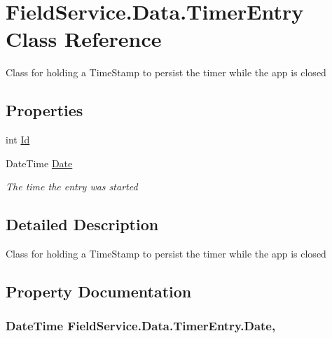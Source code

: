 \hypertarget{class_field_service_1_1_data_1_1_timer_entry}{\section{Field\+Service.\+Data.\+Timer\+Entry Class Reference}
\label{class_field_service_1_1_data_1_1_timer_entry}
}


Class for holding a Time\+Stamp to persist the timer while the app is closed  


\subsection*{Properties}
\begin{DoxyCompactItemize}
\item 
int \hyperlink{class_field_service_1_1_data_1_1_timer_entry_ab9e04cf51877fe4262e32bf902341049}{Id}
\item 
Date\+Time \hyperlink{class_field_service_1_1_data_1_1_timer_entry_acb69cc10e714c981b493c81715c900c3}{Date}
\begin{DoxyCompactList}\small\item\em The time the entry was started \end{DoxyCompactList}\end{DoxyCompactItemize}


\subsection{Detailed Description}
Class for holding a Time\+Stamp to persist the timer while the app is closed 



\subsection{Property Documentation}
\hypertarget{class_field_service_1_1_data_1_1_timer_entry_acb69cc10e714c981b493c81715c900c3}{
\subsubsection[{Date}]{\setlength{\rightskip}{0pt plus 5cm}Date\+Time Field\+Service.\+Data.\+Timer\+Entry.\+Date\hspace{0.3cm}{\ttfamily [get]}, {\ttfamily [set]}}}\label{class_field_service_1_1_data_1_1_timer_entry_acb69cc10e714c981b493c81715c900c3}


